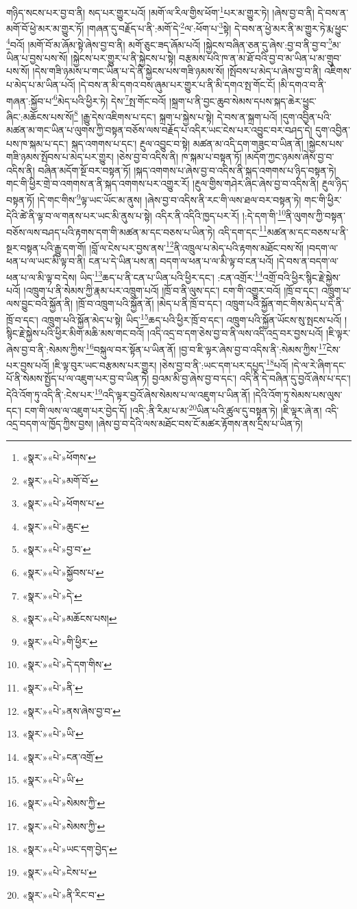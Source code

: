 གཉིད་སངས་པར་བྱ་བ་ནི། སད་པར་གྱུར་པའོ། །མགོ་ལ་རིལ་གྱིས་ཕོག་\footnote{«སྣར་»«པེ་»ཕོགས་}པར་མ་གྱུར་ཏེ། །ཞེས་བྱ་བ་ནི། དེ་བས་ན་མགོ་བོ་ཕྱེ་མར་མ་གྱུར་ཏོ། །གཞན་དུ་བརྗོད་པ་ནི་:མགོ་དེ་\footnote{«སྣར་»«པེ་»མགོ་བོ་}ལ་:ཕོག་པ་\footnote{«སྣར་»«པེ་»ཕོགས་པ་}སྟེ། དེ་བས་ན་ཕྱེ་མར་ནི་མ་གྱུར་ཏེ་རྨ་ཕྱུང་\footnote{«སྣར་»«པེ་»ཆུང་}བའོ། །མགོ་བོ་མ་ཞོམ་སྟེ་ཞེས་བྱ་བ་ནི། མགོ་ཅུང་ཟད་ཞོམ་པའོ། །སྐྱེངས་བཞིན་ཅན་དུ་ཞེས་:བྱ་བ་ནི་བྱ་བ་\footnote{«སྣར་»«པེ་»བྱ་བ་}མ་ཡིན་པ་བྱས་པས་སོ། །སྐྱེངས་པར་གྱུར་པ་ནི་སྐྱེངས་པ་སྟེ། བརྩམས་པའི་ཁ་ན་མ་ཐོ་བའི་བྱ་བ་མ་ཡིན་པ་མ་གྲུབ་པས་སོ། །དེས་གཟི་ཉམས་པ་གང་ཡིན་པ་དེ་ནི་སྐྱེངས་པས་གཟི་ཉམས་སོ། །སྤོབས་པ་མེད་པ་ཞེས་བྱ་བ་ནི། འཇིགས་པ་མེད་པ་མ་ཡིན་པའོ། །དེ་བས་ན་མི་དགའ་བས་ཞུམ་པར་གྱུར་པ་ནི་མི་དགའ་སྤ་གོང་ངོ། །མི་དགའ་བ་ནི་གཞན་:སྐྱོབ་པ་\footnote{«སྣར་»«པེ་»སྐྱོབས་པ་}མེད་པའི་ཕྱིར་ཏེ། དེས་\footnote{«སྣར་»«པེ་»དེ་}སྤ་གོང་བའོ། །སྐྲག་པ་ནི་བྱང་ཆུབ་སེམས་དཔས་སྐད་ཆེར་ཕྱུང་ཞིང་:མཆོངས་པས་སོ།\footnote{«སྣར་»«པེ་»མཆོངས་པས།} །རྒྱུ་དེས་འཇིགས་པ་དང་། སྐྲག་པ་སྐྱེས་པ་སྟེ། དེ་བས་ན་སྐྲག་པའོ། །དུག་འབྱིན་པའི་མཚན་མ་གང་ཡིན་པ་ལུགས་ཀྱི་བསྟན་བཅོས་ལས་བརྗོད་པ་འདིར་ཡང་ངེས་པར་འབྱུང་བར་བཤད་དེ། དུག་འབྱིན་པས་ཁ་སྐམ་པ་དང་། སྐད་འགགས་པ་དང་། རྔུལ་འབྱུང་བ་སྟེ། མཚན་མ་འདི་དག་གཟུང་བ་ཡིན་ནོ། །སྐྱེངས་པས་གཟི་ཉམས་སྤོབས་པ་མེད་པར་གྱུར། །ཅེས་བྱ་བ་འདིས་ནི། ཁ་སྐམ་པ་བསྟན་ཏོ། །མདོག་ཀྱང་ཉམས་ཞེས་བྱ་བ་འདིས་ནི། བཞིན་མདོག་སྔོ་བར་བསྟན་ཏོ། །སྐད་འགགས་པ་ཞེས་བྱ་བ་འདིས་ནི་སྐད་འགགས་པ་ཉིད་བསྟན་ཏེ། གང་གི་ཕྱིར་གྲེ་བ་འགགས་ན་ནི་སྐད་འགགས་པར་འགྱུར་རོ། །རྔུལ་གྱིས་གཤེར་ཞིང་ཞེས་བྱ་བ་འདིས་ནི། རྔུལ་ཉིད་བསྟན་ཏོ། །དེ་གང་གིས་\footnote{«སྣར་»«པེ་»གི་ཕྱིར་}ལྟ་ཡང་ཡོང་མ་ནུས། །ཞེས་བྱ་བ་འདིས་ནི་རང་གི་ལས་ཐལ་བར་བསྟན་ཏེ། གང་གི་ཕྱིར་དེའི་ཚེ་ནི་ལྟ་བ་ལ་གནས་པར་ཡང་མི་ནུས་པ་སྟེ། འདིར་ནི་འདིའི་ཁྱད་པར་རོ། །:དེ་དག་གི་\footnote{«སྣར་»«པེ་»དེ་དག་གིས་}ནི་ལུགས་ཀྱི་བསྟན་བཅོས་ལས་བཤད་པའི་རྟགས་དག་གི་མཚན་མ་དང་བཅས་པ་ཡིན་ཏེ། འདི་དག་དང་\footnote{«སྣར་»«པེ་»ནི་}མཚན་མ་དང་བཅས་པ་ནི་སྔར་བསྟན་པའི་རྒྱུ་དག་གོ། །བློ་ལ་ངེས་པར་བྱས་ནས་\footnote{«སྣར་»«པེ་»ནས་ཞེས་བྱ་བ་}ནི་འཁྲུལ་པ་མེད་པའི་རྟགས་མཐོང་བས་སོ། །བདག་ལ་ཕན་པ་ལ་ཡང་མི་ལྟ་བ་ནི། ངན་པ་དེ་ཡིན་པས་ན། བདག་ལ་ཕན་པ་ལ་མི་ལྟ་བ་ངན་པའོ། །དེ་བས་ན་བདག་ལ་ཕན་པ་ལ་མི་ལྟ་བ་དེས། ཡིད་\footnote{«སྣར་»«པེ་»ཡི་}ཆད་པ་ནི་ངན་པ་ཡིན་པའི་ཕྱིར་དང་། :ངན་འགྲོར་\footnote{«སྣར་»«པེ་»ངན་འགྲོ་}འགྲོ་བའི་ཕྱིར་སྙིང་རྗེ་སྐྱེས་པའོ། །འཁྲུག་པ་ནི་སེམས་ཀྱི་རྣམ་པར་འཁྲུག་པའོ། །ཁྲོ་བ་ནི་ལུས་དང་། ངག་གི་འགྱུར་བའོ། །ཁྲོ་བ་དང་། འཁྲུག་པ་ལས་བྱུང་བའི་སྐྱོན་ནི། །ཁྲོ་བ་འཁྲུག་པའི་སྐྱོན་ནོ། །མེད་པ་ནི་ཁྲོ་བ་དང་། འཁྲུག་པའི་སྐྱོན་གང་གིས་མེད་པ་དེ་ནི་ཁྲོ་བ་དང་། འཁྲུག་པའི་སྐྱོན་མེད་པ་སྟེ། ཡིད་\footnote{«སྣར་»«པེ་»ཡི་}ཆད་པའི་ཕྱིར་ཁྲོ་བ་དང་། འཁྲུག་པའི་སྐྱོན་ཡོངས་སུ་སྤངས་པའོ། །སྙིང་རྗེ་སྐྱེས་པའི་ཕྱིར་མིག་མཆི་མས་གང་བའོ། །འདི་འདྲ་བ་དག་ཅེས་བྱ་བ་ནི་ལས་འདི་འདྲ་བར་བྱས་པའོ། །ཇི་ལྟར་ཞེས་བྱ་བ་ནི་:སེམས་ཀྱིས་\footnote{«སྣར་»«པེ་»སེམས་ཀྱི་}བསྐུལ་བར་སྟོན་པ་ཡིན་ནོ། །བྱ་བ་ཇི་ལྟར་ཞེས་བྱ་བ་འདིས་ནི་:སེམས་ཀྱིས་\footnote{«སྣར་»«པེ་»སེམས་ཀྱི་}ངེས་པར་བྱས་པའོ། །ཇི་ལྟ་བུར་ཡང་བརྩམས་པར་གྱུར། །ཅེས་བྱ་བ་ནི་:ཡང་དག་པར་དཔྱད་\footnote{«སྣར་»«པེ་»ཡང་དག་བྱེད་}པའོ། །དེ་ལ་རེ་ཞིག་དང་པོ་ནི་སེམས་སྤྱོད་པ་ལ་འཇུག་པར་བྱ་བ་ཡིན་ཏེ། བྱའམ་མི་བྱ་ཞེས་བྱ་བ་དང་། འདི་ནི་དེ་བཞིན་དུ་བྱའོ་ཞེས་པ་དང་། དེའི་འོག་ཏུ་འདི་ནི་:ངེས་པར་\footnote{«སྣར་»«པེ་»ངེས་པ་}འདི་ལྟར་བྱའོ་ཞེས་སེམས་པ་ལ་འཇུག་པ་ཡིན་ནོ། །དེའི་འོག་ཏུ་སེམས་པས་ལུས་དང་། ངག་གི་ལས་ལ་འཇུག་པར་བྱེད་དོ། །འདི་:ནི་རིམ་པ་མ་\footnote{«སྣར་»«པེ་»ནི་རིང་བ་}ཡིན་པའི་ཚུལ་དུ་བསྟན་ཏེ། །ཇི་ལྟར་ཞེ་ན། འདི་འདྲ་བདག་ལ་ཁྱོད་ཀྱིས་བྱས། །ཞེས་བྱ་བ་དེའི་ལས་མཐོང་བས་ངོ་མཚར་རྟོགས་ནས་དྲིས་པ་ཡིན་ཏེ། 